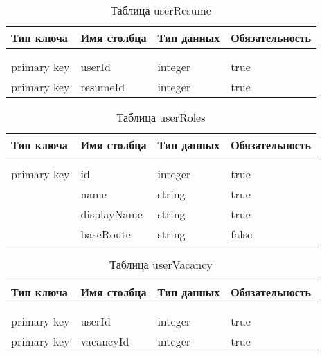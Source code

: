 \begin{xltabular}{\textwidth}{|l|l|p{1.7cm}|X|}
	\caption{Таблица userResume \label{userResume:table}}\\ \hline
	\centrow Тип ключа & \centrow Имя столбца & \centrow Тип данных & \centrow Обязательность \\ \hline
	 &  &  &  \\ \hline
	\endfirsthead
	 &  &  &  \\ \hline
	\finishhead
	primary key & userId & integer & true \\ \hline 
	primary key & resumeId & integer & true \\ \hline
\end{xltabular}

\begin{xltabular}{\textwidth}{|l|l|p{1.7cm}|X|}
	\caption{Таблица userRoles \label{userRoles:table}}\\ \hline
	\centrow Тип ключа & \centrow Имя столбца & \centrow Тип данных & \centrow Обязательность \\ \hline
	 &  &  &  \\ \hline
	\endfirsthead
	 &  &  &  \\ \hline
	\finishhead
	primary key & id & integer & true \\ \hline 
	& name & string & true \\ \hline 
	& displayName & string & true \\ \hline 
	& baseRoute & string & false \\ \hline
\end{xltabular}

\begin{xltabular}{\textwidth}{|l|l|p{1.7cm}|X|}
	\caption{Таблица userVacancy \label{userVacancy:table}}\\ \hline
	\centrow Тип ключа & \centrow Имя столбца & \centrow Тип данных & \centrow Обязательность \\ \hline
	 &  &  &  \\ \hline
	\endfirsthead
	 &  &  &  \\ \hline
	\finishhead
	primary key & userId & integer & true \\ \hline 
	primary key & vacancyId & integer & true \\ \hline
\end{xltabular}

